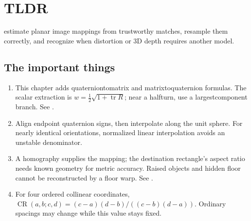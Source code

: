 \documentclass[letterpaper,11pt,english,openany,oneside]{jupyterBook}
\begin{document}
\sphinxstepscope


\section{TLDR}
\label{\detokenize{lectures/lecture02/tldr:tldr}}\label{\detokenize{lectures/lecture02/tldr:lec02-tldr}}\label{\detokenize{lectures/lecture02/tldr::doc}}
\sphinxAtStartPar
{} estimate planar image mappings from trustworthy matches, resample them correctly, and recognize when distortion or 3D depth requires another model.


\subsection{The important things}
\label{\detokenize{lectures/lecture02/tldr:the-important-things}}\begin{enumerate}
%
\item {}
\sphinxAtStartPar
{} This chapter adds quaternion\sphinxhyphen{}to\sphinxhyphen{}matrix and matrix\sphinxhyphen{}to\sphinxhyphen{}quaternion formulas. The scalar extraction is \(w=\tfrac12\sqrt{1+\operatorname{tr}R}\); near a half\sphinxhyphen{}turn, use a largest\sphinxhyphen{}component branch. See {\hyperref[\detokenize{lectures/lecture02/quaternions:lec02-quaternions}]{}}.

\item {}
\sphinxAtStartPar
{} Align endpoint quaternion signs, then interpolate along the unit sphere. For nearly identical orientations, normalized linear interpolation avoids an unstable denominator.

\item {}
\sphinxAtStartPar
{} A homography supplies the mapping; the destination rectangle’s aspect ratio needs known geometry for metric accuracy. Raised objects and hidden floor cannot be reconstructed by a floor warp. See {\hyperref[\detokenize{lectures/lecture02/homographies:lec02-homographies}]{}}.

\item {}
\sphinxAtStartPar
{} For four ordered collinear coordinates, \(\operatorname{CR}(a,b;c,d)=(c-a)(d-b)/((c-b)(d-a))\). Ordinary spacings may change while this value stays fixed.


\end{enumerate}
\end{document}
